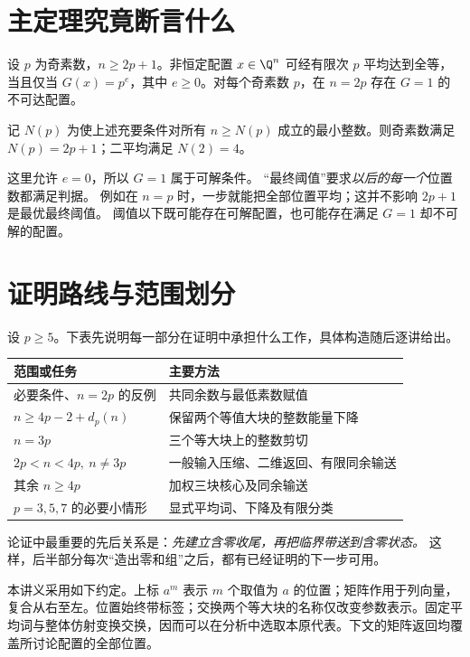 \section{主定理究竟断言什么}

\begin{theorem}[素数平均的充要条件]\label{thm:prime}
设 $p$ 为奇素数，$n\ge2p+1$。非恒定配置 $x\in\Q^n$ 可经有限次 $p$ 平均达到全等，当且仅当 $G(x)=p^e$，其中 $e\ge0$。对每个奇素数 $p$，在 $n=2p$ 存在 $G=1$ 的不可达配置。
\end{theorem}

\begin{corollary}[最优最终阈值]\label{cor:threshold}
记 $N(p)$ 为使上述充要条件对所有 $n\ge N(p)$ 成立的最小整数。则奇素数满足 $N(p)=2p+1$；二平均满足 $N(2)=4$。
\end{corollary}


这里允许 $e=0$，所以 $G=1$ 属于可解条件。
“最终阈值”要求\emph{以后的每一个}位置数都满足判据。
例如在 $n=p$ 时，一步就能把全部位置平均；这并不影响 $2p+1$ 是最优最终阈值。
阈值以下既可能存在可解配置，也可能存在满足 $G=1$ 却不可解的配置。

\section{证明路线与范围划分}
设 $p\ge5$。下表先说明每一部分在证明中承担什么工作，具体构造随后逐讲给出。
\begin{center}
\begin{tabular}{p{}p{}}
\toprule 范围或任务 & 主要方法\\\midrule
必要条件、$n=2p$ 的反例 & 共同余数与最低素数赋值\\
$n\ge4p-2+d_p(n)$ & 保留两个等值大块的整数能量下降\\
$n=3p$ & 三个等大块上的整数剪切\\
$2p<n<4p,\ n\ne3p$ & 一般输入压缩、二维返回、有限同余输送\\
其余 $n\ge4p$ & 加权三块核心及同余输送\\
$p=3,5,7$ 的必要小情形 & 显式平均词、下降及有限分类\\
\bottomrule
\end{tabular}
\end{center}
论证中最重要的先后关系是：\emph{先建立含零收尾，再把临界带送到含零状态。}
这样，后半部分每次“造出零和组”之后，都有已经证明的下一步可用。

本讲义采用如下约定。上标 $a^m$ 表示 $m$ 个取值为 $a$ 的位置；矩阵作用于列向量，复合从右至左。位置始终带标签；交换两个等大块的名称仅改变参数表示。固定平均词与整体仿射变换交换，因而可以在分析中选取本原代表。下文的矩阵返回均覆盖所讨论配置的全部位置。

